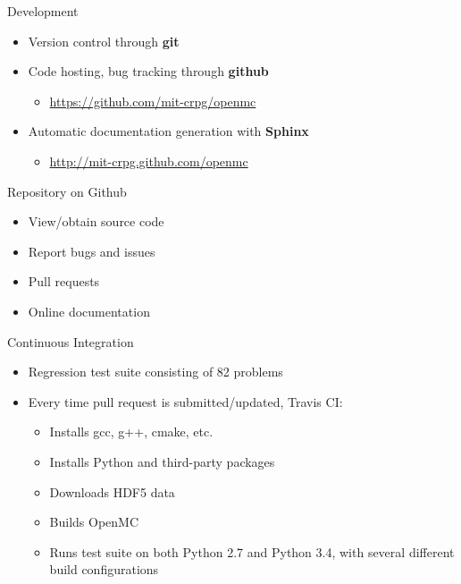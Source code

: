 \documentclass[noamssymb,svgnames]{beamer}
\begin{document}
\begin{frame}{Development}
  \begin{itemize}
  \item Version control through \textbf{git}
  \item Code hosting, bug tracking through \textbf{github}
    \begin{itemize}
    \item\url{https://github.com/mit-crpg/openmc}
    \end{itemize}
  \item Automatic documentation generation with \textbf{Sphinx}
    \begin{itemize}
    \item\url{http://mit-crpg.github.com/openmc}
    \end{itemize}
  \end{itemize}
\end{frame}

\begin{frame}{Repository on Github}
  \begin{itemize}
  \item View/obtain source code
  \item Report bugs and issues
  \item Pull requests
  \item Online documentation
  \end{itemize}
\end{frame}

\begin{frame}{Continuous Integration}
  \begin{itemize}
  \item Regression test suite consisting of 82 problems
  \item Every time pull request is submitted/updated, Travis CI:
    \begin{itemize}
    \item Installs gcc, g++, cmake, etc.
    \item Installs Python and third-party packages
    \item Downloads HDF5 data
    \item Builds OpenMC
    \item Runs test suite on both Python 2.7 and Python 3.4, with several
      different build configurations
    \end{itemize}
  \end{itemize}
\end{frame}
\end{document}
